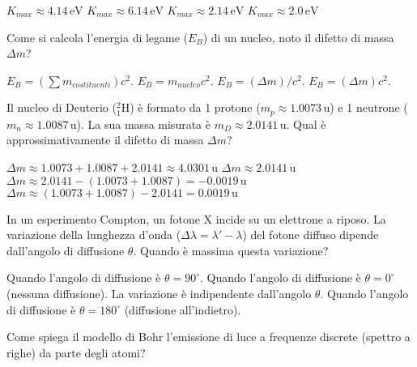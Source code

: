 \documentclass{exam}%
\begin{document}
\begin{questions}
\vspace{0.2em}%
\begin{multicols}{4}%
\begin{choices}%
\choice $K_{max} \approx 4.14 \, \text{eV}$%
\choice $K_{max} \approx 6.14 \, \text{eV}$%
\choice $K_{max} \approx 2.14 \, \text{eV}$%
\choice $K_{max} \approx 2.0 \, \text{eV}$%
\end{choices}%
\end{multicols}%
\question Come si calcola l'energia di legame ($E_B$) di un nucleo, noto il difetto di massa $\Delta m$?%
\vspace{0.2em}%
\begin{multicols}{4}%
\begin{choices}%
\choice $E_B = (\sum m_{costituenti}) c^2$.%
\choice $E_B = m_{nucleo} c^2$.%
\choice $E_B = (\Delta m) / c^2$.%
\choice $E_B = (\Delta m) c^2$.%
\end{choices}%
\end{multicols}%
\question Il nucleo di Deuterio ($^2_1\text{H}$) è formato da 1 protone ($m_p \approx 1.0073 \, \text{u}$) e 1 neutrone ($m_n \approx 1.0087 \, \text{u}$). La sua massa misurata è $m_D \approx 2.0141 \, \text{u}$. Qual è approssimativamente il difetto di massa $\Delta m$?%
\vspace{0.2em}%
\begin{multicols}{2}%
\begin{choices}%
\choice $\Delta m \approx 1.0073 + 1.0087 + 2.0141 \approx 4.0301 \, \text{u}$%
\choice $\Delta m \approx 2.0141 \, \text{u}$%
\choice $\Delta m \approx 2.0141 - (1.0073 + 1.0087) = -0.0019 \, \text{u}$%
\choice $\Delta m \approx (1.0073 + 1.0087) - 2.0141 = 0.0019 \, \text{u}$%
\end{choices}%
\end{multicols}%
\question In un esperimento Compton, un fotone X incide su un elettrone a riposo. La variazione della lunghezza d'onda ($\Delta \lambda = \lambda' - \lambda$) del fotone diffuso dipende dall'angolo di diffusione $\theta$. Quando è massima questa variazione?%
\vspace{0.2em}%
\begin{choices}%
\choice Quando l'angolo di diffusione è $\theta = 90^\circ$.%
\choice Quando l'angolo di diffusione è $\theta = 0^\circ$ (nessuna diffusione).%
\choice La variazione è indipendente dall'angolo $\theta$.%
\choice Quando l'angolo di diffusione è $\theta = 180^\circ$ (diffusione all'indietro).%
\end{choices}%
\question Come spiega il modello di Bohr l'emissione di luce a frequenze discrete (spettro a righe) da parte degli atomi?%

\end{questions}
\end{document}
